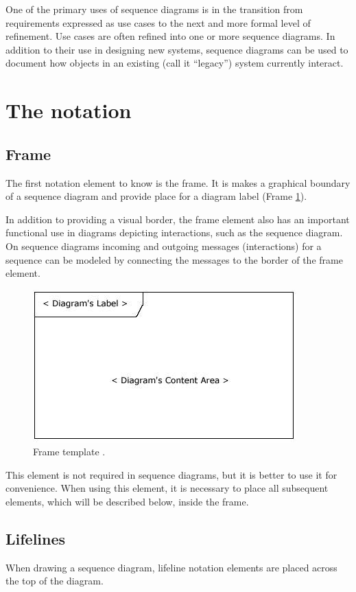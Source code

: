\documentclass[10pt, twoside, slovak,a4paper]{article}
\begin{document}
One of the primary uses of sequence diagrams is in the transition from requirements expressed as use cases to the next and more formal level of refinement. Use cases are often refined into one or more sequence diagrams. In addition to their use in designing new systems, sequence diagrams can be used to document how objects in an existing (call it “legacy”) system currently interact\cite{Sequence_diagram:Lambert}.
\section{The notation} \label{notation}

\subsection{Frame} \label{notation:frame}

The first notation element to know is the frame. It is makes a graphical boundary of a sequence diagram and provide place for a diagram label (Frame \ref{fig:frame}).

In addition to providing a visual border, the frame element also has an important functional use in diagrams depicting interactions, such as the sequence diagram. On sequence diagrams incoming and outgoing messages (interactions) for a sequence can be modeled by connecting the messages to the border of the frame element.
\begin{figure}[tbh]
\centering
\includegraphics[scale=0.35]{frame.jpg}
\caption{Frame template \cite{Sequence_diagram:Lambert}.}
\label{fig:frame}
\end{figure}

This element is not required in sequence diagrams, but it is better to use it for convenience. When using this element, it is necessary to place all subsequent elements, which will be described below, inside the frame.

\subsection{Lifelines} \label{notation:lifelines}
When drawing a sequence diagram, lifeline notation elements are placed across the top of the diagram.
\end{document}
